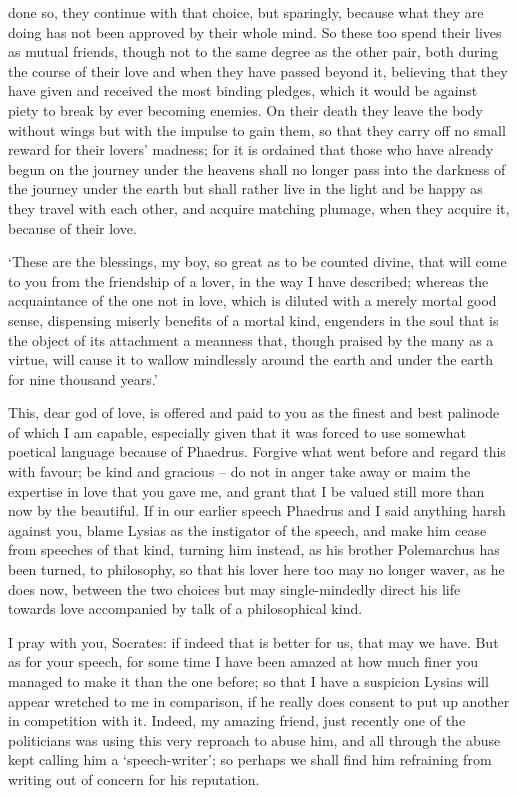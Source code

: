 done so, they continue with that choice, but sparingly, because what
they are doing has not been approved by their whole mind. So these too
spend their lives as mutual friends, though  not to the same
degree as the other pair, both during the course of their love and when
they have passed beyond it, believing that they have given and received
the most binding pledges, which it would be against piety to break by
ever becoming  enemies. On their death they leave the body
without wings but with the impulse to gain them, so that they carry off
no small reward for their lovers' madness; for it is ordained that those
who have already begun on the journey under the heavens shall no longer
pass into the darkness of the journey under the earth but shall rather
live in the light and be happy as they travel  with each other,
and acquire matching plumage, when they acquire it, because of their
love.

‘These are the blessings, my boy, so great as to be counted divine, that
will come to you from the friendship of a lover, in the way I have
described; whereas the acquaintance of the one  not in love,
which is diluted with a merely mortal good sense, dispensing miserly
benefits of a mortal kind, engenders in the soul that is the object of
its attachment a meanness that, though  praised by the many as
a virtue, will cause it to wallow mindlessly around the earth and under
the earth for nine thousand years.'

This, dear god of love, is offered and paid to you as the finest
 and best palinode of which I am capable, especially given that
it was forced to use somewhat poetical language because of
Phaedrus. Forgive what
went before and regard this with favour; be kind and gracious -- do not
in anger take away or maim the expertise in love that you gave
me, and grant that
 I be valued still more than now by the beautiful. If in our
earlier speech Phaedrus and I said anything harsh against you, blame
Lysias as the instigator of the speech, and make him cease from speeches
of that kind, turning him instead, as his brother
Polemarchus has been
turned, to philosophy, so that his lover here too may no longer waver,
as he does now, between the  two choices but may single-mindedly
direct his life towards love accompanied by
talk of a philosophical
kind.

I pray with you, Socrates: if indeed that is better 
for us, that may we have. But as for your speech, for some time I have
been amazed at how much finer you managed to make it than the one
before; so that I have a suspicion Lysias will appear wretched to me in
comparison, if he really does consent to put up another in competition
with it. Indeed, my amazing friend, just recently one of the politicians
was using this very  reproach to abuse him, and all through the
abuse kept calling him a ‘speech-writer'; so perhaps we shall find him
refraining from writing out of concern for his reputation.

